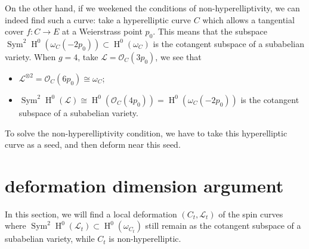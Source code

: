 \documentclass[UTF8]{amsart}
\numberwithin{equation}{section}
\theoremstyle{plain}
\numberwithin{equation}{section}
\theoremstyle{remark}
\DeclareMathOperator{\Sym}{\operatorname{Sym}}
\DeclareMathOperator{\Hnm}{\operatorname{H}}
\begin{document}
On the other hand, if we weekened the conditions of non-hyperelliptivity, we can indeed find such a curve: take a hyperelliptic curve $C$ which allows a tangential cover $f:C \longrightarrow E$ at a Weierstrass point $p_0$. This means that the subspace $\Sym^2 \Hnm^0(\omega_C(-2p_0)) \subset \Hnm^0(\omega_C)$ is the cotangent subspace of a subabelian variety. When $g=4$, take $\mathcal{L}=\mathcal{O}_C(3p_0)$, we see that 
\begin{itemize}
\item $\mathcal{L}^{\otimes 2}= \mathcal{O}_C(6p_0) \cong \omega_C$;
\item $\Sym^2 \Hnm^0(\mathcal{L}) \cong \Hnm^0\left(\mathcal{O}_C(4p_0)\right) = \Hnm^0\left(\omega_C(-2p_0)\right)$ is the cotangent subspace of a subabelian variety.
\end{itemize}
To solve the non-hyperelliptivity condition, we have to take this hyperelliptic curve as a seed, and then deform near this seed.

\section{deformation dimension argument}

In this section, we will find a local deformation $(C_t,\mathcal{L}_t)$ of the spin curves where $\Sym^2 \Hnm^0(\mathcal{L}_t) \subset \Hnm^0(\omega_{C_t})$ still remain as the cotangent subspace of a subabelian variety, while $C_t$ is non-hyperelliptic. 
\end{document}
